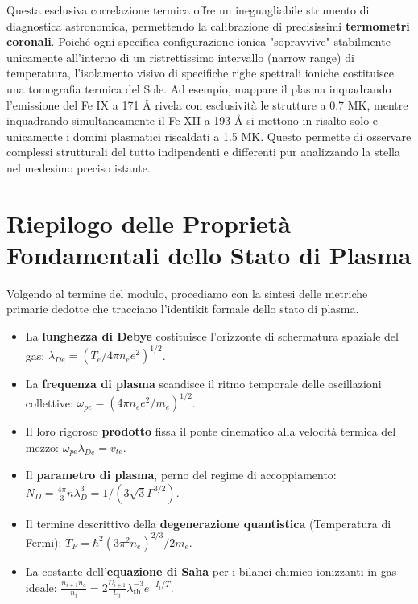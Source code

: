 Questa esclusiva correlazione termica offre un ineguagliabile strumento di diagnostica astronomica, permettendo la calibrazione di precisissimi \textbf{termometri coronali}. Poiché ogni specifica configurazione ionica "sopravvive" stabilmente unicamente all'interno di un ristrettissimo intervallo (narrow range) di temperatura, l'isolamento visivo di specifiche righe spettrali ioniche costituisce una tomografia termica del Sole. Ad esempio, mappare il plasma inquadrando l'emissione del Fe IX a 171 Å rivela con esclusività le strutture a 0.7 MK, mentre inquadrando simultaneamente il Fe XII a 193 Å si mettono in risalto solo e unicamente i domini plasmatici riscaldati a 1.5 MK. Questo permette di osservare complessi strutturali del tutto indipendenti e differenti pur analizzando la stella nel medesimo preciso istante.

\section{Riepilogo delle Proprietà Fondamentali dello Stato di Plasma}

Volgendo al termine del modulo, procediamo con la sintesi delle metriche primarie dedotte che tracciano l'identikit formale dello stato di plasma.
\begin{itemize}
\item La \textbf{lunghezza di Debye} costituisce l'orizzonte di schermatura spaziale del gas: $\lambda_{De} = (T_e / 4\pi n_e e^2)^{1/2}$.
\item La \textbf{frequenza di plasma} scandisce il ritmo temporale delle oscillazioni collettive: $\omega_{pe} = (4\pi n_e e^2 / m_e)^{1/2}$.
\item Il loro rigoroso \textbf{prodotto} fissa il ponte cinematico alla velocità termica del mezzo: $\omega_{pe} \lambda_{De} = v_{te}$.
\item Il \textbf{parametro di plasma}, perno del regime di accoppiamento: $N_D = \frac{4\pi}{3} n \lambda_D^3 = 1 / (3\sqrt{3}\Gamma^{3/2})$.
\item Il termine descrittivo della \textbf{degenerazione quantistica} (Temperatura di Fermi): $T_F = \hbar^2 (3\pi^2 n_e)^{2/3} / 2m_e$.
\item La costante dell'\textbf{equazione di Saha} per i bilanci chimico-ionizzanti in gas ideale: $\frac{n_{i+1} n_e}{n_i} = 2 \frac{U_{i+1}}{U_i} \lambda_{\text{th}}^{-3} e^{-I_i/T}$.
\end{itemize}

